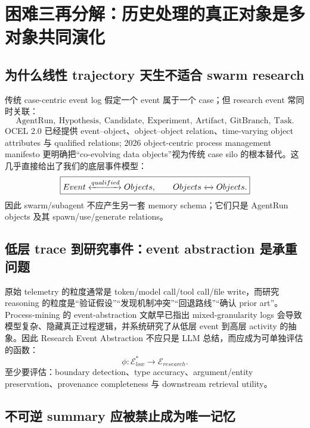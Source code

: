 \documentclass[11pt,a4paper]{ctexart}
\begin{document}
\section{困难三再分解：历史处理的真正对象是多对象共同演化}

\subsection{为什么线性 trajectory 天生不适合 swarm research}

传统 case-centric event log 假定一个 event 属于一个 case；但 research event 常同时关联：
\[
\text{AgentRun},\ \text{Hypothesis},\ \text{Candidate},\ \text{Experiment},\ \text{Artifact},\ \text{GitBranch},\ \text{Task}.
\]
OCEL 2.0 已经提供 event--object、object--object relation、time-varying object attributes 与 qualified relations\cite{ocel2023}; 2026 object-centric process management manifesto 更明确把“co-evolving data objects”视为传统 case silo 的根本替代\cite{seidel2026ocpm}。这几乎直接给出了我们的底层事件模型：
\begin{equation}
\boxed{
Event\xleftrightarrow{qualified}Objects,
\qquad Objects\xleftrightarrow{}Objects.
}
\end{equation}
因此 swarm/subagent 不应产生另一套 memory schema；它们只是 AgentRun objects 及其 spawn/use/generate relations。

\subsection{低层 trace 到研究事件：event abstraction 是承重问题}

原始 telemetry 的粒度通常是 token/model call/tool call/file write，而研究 reasoning 的粒度是“验证假设”“发现机制冲突”“回退路线”“确认 prior art”。Process-mining 的 event-abstraction 文献早已指出 mixed-granularity logs 会导致模型复杂、隐藏真正过程逻辑，并系统研究了从低层 event 到高层 activity 的抽象\cite{vanzelst2021abstraction}。因此 Research Event Abstraction 不应只是 LLM 总结，而应成为可单独评估的函数：
\begin{equation}
\phi:\mathcal E_{low}^{*}\to \mathcal E_{research}.
\end{equation}
至少要评估：boundary detection、type accuracy、argument/entity preservation、provenance completeness 与 downstream retrieval utility。

\subsection{不可逆 summary 应被禁止成为唯一记忆}
\end{document}
